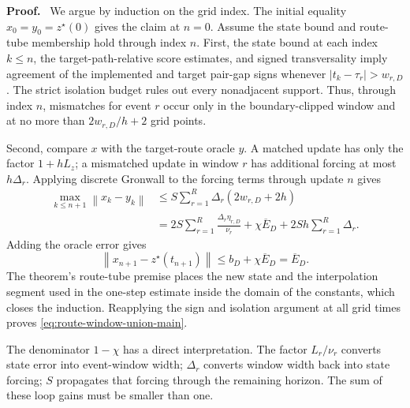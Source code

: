\documentclass[twoside,11pt]{article}
\renewenvironment{proof}[1][Proof]{\par\noindent\textbf{#1.}\ }{\hfill\BlackBox\par\medskip}
\newcommand{\norm}[1]{\left\lVert #1\right\rVert}
\begin{document}
\begin{proof}
We argue by induction on the grid index.  The initial equality
$x_0=y_0=z^\star(0)$ gives the claim at $n=0$.  Assume the state bound and
route-tube membership hold through index $n$.  First, the state bound at each
index $k\le n$, the target-path-relative score estimates, and signed
transversality imply agreement of the implemented and target pair-gap signs
whenever $|t_k-\tau_r|>w_{r,D}$.  The strict isolation budget rules out every
nonadjacent support.  Thus, through index $n$, mismatches for event $r$ occur
only in the boundary-clipped window and at no more than
$2w_{r,D}/h+2$ grid points.

Second, compare $x$ with the target-route oracle $y$.  A matched update has
only the factor $1+hL_z$; a mismatched update in window $r$ has additional
forcing at most $h\Delta_r$.  Applying discrete Gronwall to the forcing terms
through update $n$ gives
\begin{align}
 \max_{k\le n+1}\norm{x_k-y_k}
 &\le S\sum_{r=1}^R\Delta_r(2w_{r,D}+2h)\nonumber\\
 &=2S\sum_{r=1}^R\frac{\Delta_r\eta_{r,D}}{\nu_r}
   +\chi\overline E_D+2Sh\sum_{r=1}^R\Delta_r.
 \label{eq:route-gronwall-main}
\end{align}
Adding the oracle error gives
\[
 \norm{x_{n+1}-z^\star(t_{n+1})}
 \le b_D+\chi\overline E_D=\overline E_D.
\]
The theorem's route-tube premise places the new state and the interpolation
segment used in the one-step estimate inside the domain of the constants,
which closes the induction.  Reapplying the sign and isolation argument at all
grid times proves \eqref{eq:route-window-union-main}.
\end{proof}

The denominator $1-\chi$ has a direct interpretation.  The factor $L_r/\nu_r$ converts state error into event-window width; $\Delta_r$ converts window width back into state forcing; $S$ propagates that forcing through the remaining horizon.  The sum of these loop gains must be smaller than one.
\end{document}
